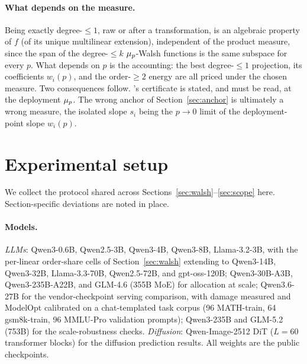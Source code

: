 \paragraph{What depends on the measure.} Being exactly degree-$\le 1$, raw or after a transformation, is
an algebraic property of $f$ (of its unique multilinear extension), independent of the product measure,
since the span of the degree-$\le k$ $\mu_p$-Walsh functions is the same subspace for every $p$. What depends
on $p$ is the accounting: the best degree-$\le 1$ projection, its coefficients $w_i(p)$, and the
order-$\ge 2$ energy are all priced under the chosen measure. Two consequences follow. \thmone's
certificate is stated, and must be read, at the deployment $\mu_p$. The wrong anchor of Section~\ref{sec:anchor} is
ultimately a wrong measure, the isolated slope $s_i$ being the $p\to 0$ limit of the deployment-point slope
$w_i(p)$. 

\section{Experimental setup}\label{app:setup}

We collect the protocol shared across Sections~\ref{sec:walsh}--\ref{sec:scope} here. Section-specific
deviations are noted in place.

\paragraph{Models.} \emph{LLMs}: Qwen3-0.6B, Qwen2.5-3B, Qwen3-4B, Qwen3-8B, Llama-3.2-3B,
 with the per-linear order-share cells of
Section~\ref{sec:walsh} extending to Qwen3-14B, Qwen3-32B, Llama-3.3-70B, Qwen2.5-72B, and
gpt-oss-120B; Qwen3-30B-A3B, Qwen3-235B-A22B, and GLM-4.6 (355B
MoE) for allocation at scale; Qwen3.6-27B for the vendor-checkpoint serving comparison,
with damage measured and ModelOpt calibrated on a chat-templated task corpus (96 MATH-train, 64
gsm8k-train, 96 MMLU-Pro validation prompts); Qwen3-235B and GLM-5.2 (753B) for the
scale-robustness checks.
\emph{Diffusion}: Qwen-Image-2512 DiT ($L=60$ transformer blocks) for the diffusion
prediction results. All weights are the public checkpoints.

